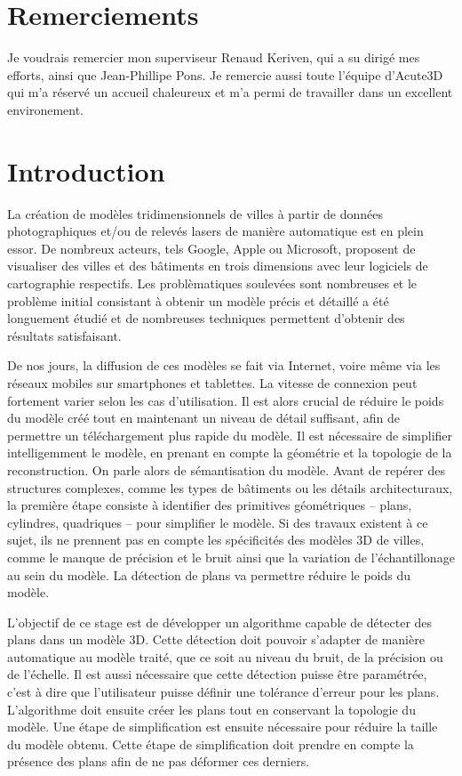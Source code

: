 \documentclass[12pt, twoside]{article}
\let\oldsection\section
\def\section{\cleardoublepage\oldsection}
\begin{document}
\section*{Remerciements}
Je voudrais remercier mon superviseur Renaud Keriven, qui a su dirigé mes efforts, ainsi que Jean-Phillipe Pons. Je remercie aussi toute l'équipe d'Acute3D qui m'a réservé un accueil chaleureux et m'a permi de travailler dans un excellent environement.
\newpage

\tableofcontents
\newpage

\section*{Introduction}
La création de modèles tridimensionnels de villes à partir de données photographiques et/ou de relevés lasers de manière automatique est en plein essor. De nombreux acteurs, tels Google, Apple ou Microsoft, proposent de visualiser des villes et des bâtiments en trois dimensions avec leur logiciels de cartographie respectifs. Les problèmatiques soulevées sont nombreuses et le problème initial consistant à obtenir un modèle précis et détaillé a été longuement étudié et de nombreuses techniques permettent d'obtenir des résultats satisfaisant.

De nos jours, la diffusion de ces modèles se fait via Internet, voire même via les réseaux mobiles sur smartphones et tablettes. La vitesse de connexion peut fortement varier selon les cas d'utilisation. Il est alors crucial de réduire le poids du modèle créé tout en maintenant un niveau de détail suffisant, afin de permettre un téléchargement plus rapide du modèle. Il est nécessaire de simplifier intelligemment le modèle, en prenant en compte la géométrie et la topologie de la reconstruction. On parle alors de sémantisation du modèle. Avant de repérer des structures complexes, comme les types de bâtiments ou les détails architecturaux, la première étape consiste à identifier des primitives géométriques -- plans, cylindres, quadriques -- pour simplifier le modèle. Si des travaux existent à ce sujet, ils ne prennent pas en compte les spécificités des modèles 3D de villes, comme le manque de précision et le bruit ainsi que la variation de l'échantillonage au sein du modèle. La détection de plans va permettre réduire le poids du modèle.

L'objectif de ce stage est de développer un algorithme capable de détecter des plans dans un modèle 3D. Cette détection doit pouvoir s'adapter de manière automatique au modèle traité, que ce soit au niveau du bruit, de la précision ou de l'échelle. Il est aussi nécessaire que cette détection puisse être paramétrée, c'est à dire que l'utilisateur puisse définir une tolérance d'erreur pour les plans. L'algorithme doit ensuite créer les plans tout en conservant la topologie du modèle. Une étape de simplification est ensuite nécessaire pour réduire la taille du modèle obtenu. Cette étape de simplification doit prendre en compte la présence des plans afin de ne pas déformer ces derniers.
\newpage
\end{document}
